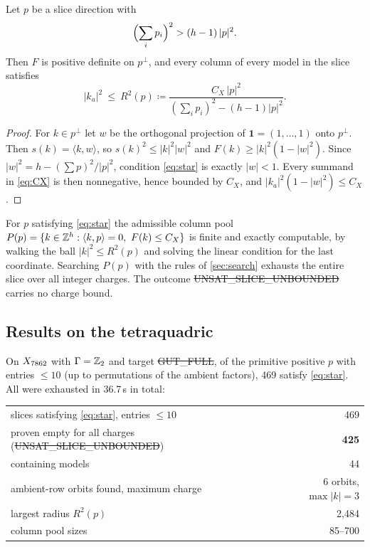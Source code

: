 \begin{proposition}\label{prop:S2}
Let $p$ be a slice direction with
\begin{equation}\label{eq:star}
\Bigl(\sum_ip_i\Bigr)^2>(h-1)\,|p|^2 .
\end{equation}
Then $F$ is positive definite on $p^\perp$, and every column of every model in
the slice satisfies
\[
|k_a|^2\ \le\ R^2(p)\coloneqq\frac{C_X\,|p|^2}{(\sum_ip_i)^2-(h-1)|p|^2}.
\]
\end{proposition}
\begin{proof}
For $k\in p^\perp$ let $w$ be the orthogonal projection of $\mathbf 1=(1,\dots,1)$
onto $p^\perp$. Then $s(k)=\langle k,w\rangle$, so $s(k)^2\le|k|^2|w|^2$ and
$F(k)\ge|k|^2(1-|w|^2)$. Since $|w|^2=h-(\sum p)^2/|p|^2$, condition \eqref{eq:star}
is exactly $|w|<1$. Every summand in \eqref{eq:CX} is then nonnegative, hence
bounded by $C_X$, and $|k_a|^2(1-|w|^2)\le C_X$.
\end{proof}

\begin{corollary}
For $p$ satisfying \eqref{eq:star} the admissible column pool
$P(p)=\{k\in\mathbb{Z}^h:\langle k,p\rangle=0,\ F(k)\le C_X\}$ is finite and exactly
computable, by walking the ball $|k|^2\le R^2(p)$ and solving the linear
condition for the last coordinate. Searching $P(p)$ with the rules of
\cref{sec:search} exhausts the entire slice over all integer charges. The outcome
\st{UNSAT\_SLICE\_UNBOUNDED} carries no charge bound.
\end{corollary}

\subsection{Results on the tetraquadric}

On $X_{7862}$ with $\Gamma=\mathbb{Z}_2$ and target \st{GUT\_FULL}, of the primitive positive
$p$ with entries $\le10$ (up to permutations of the ambient factors), 469 satisfy
\eqref{eq:star}. All were exhausted in 36.7\,s in total:

\begin{center}
\small
\begin{tabular}{@{}lr@{}}
\toprule
slices satisfying \eqref{eq:star}, entries $\le10$ & 469 \\
\quad proven empty for all charges (\st{UNSAT\_SLICE\_UNBOUNDED}) & \textbf{425} \\
\quad containing models & 44 \\
\qquad ambient-row orbits found, maximum charge & 6 orbits, $\max|k|=3$ \\
largest radius $R^2(p)$ & 2,484 \\
column pool sizes & 85--700 \\
\bottomrule
\end{tabular}
\end{center}


